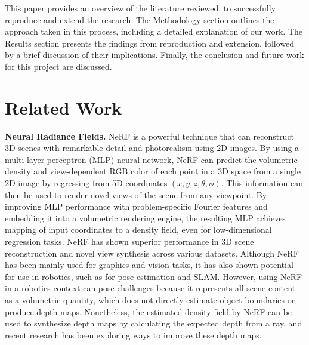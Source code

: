 \documentclass[conference]{IEEEtran}
\begin{document}
This paper provides an overview of the literature reviewed, to successfully reproduce and extend the research. The Methodology section outlines the approach taken in this process, including a detailed explanation of our work. The Results section presents the findings from reproduction and extension, followed by a brief discussion of their implications. Finally, the conclusion and future work for this project are discussed. \vspace{2mm}


\section{Related Work}
\textbf{Neural Radiance Fields.} NeRF is a powerful technique that can reconstruct 3D scenes with remarkable detail and photorealism using 2D images. By using a multi-layer perceptron (MLP) neural network, NeRF can predict the volumetric density and view-dependent RGB color of each point in a 3D space from a single 2D image by regressing from 5D coordinates $(x,y,z,\theta,\phi)$. This information can then be used to render novel views of the scene from any viewpoint. By improving MLP performance with problem-specific Fourier features \cite{tancik2020fourier} and embedding it into a volumetric rendering engine, the resulting MLP achieves mapping of input coordinates to a density field, even for low-dimensional regression tasks. NeRF has shown superior performance in 3D scene reconstruction and novel view synthesis across various datasets. Although NeRF has been mainly used for graphics and vision tasks, it has also shown potential for use in robotics, such as for pose estimation and SLAM. However, using NeRF in a robotics context can pose challenges because it represents all scene content as a volumetric quantity, which does not directly estimate object boundaries or produce depth maps. Nonetheless, the estimated density field by NeRF can be used to synthesize depth maps by calculating the expected depth from a ray, and recent research has been exploring ways to improve these depth maps. \vspace{2mm}
\end{document}
